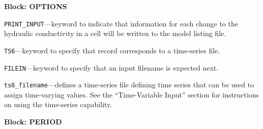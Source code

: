 
\item \textbf{Block: OPTIONS}

\begin{description}
\item \texttt{PRINT\_INPUT}---keyword to indicate that information for each change to the hydraulic conductivity in a cell will be written to the model listing file.

\item \texttt{TS6}---keyword to specify that record corresponds to a time-series file.

\item \texttt{FILEIN}---keyword to specify that an input filename is expected next.

\item \texttt{ts6\_filename}---defines a time-series file defining time series that can be used to assign time-varying values. See the ``Time-Variable Input'' section for instructions on using the time-series capability.

\end{description}
\item \textbf{Block: PERIOD}

